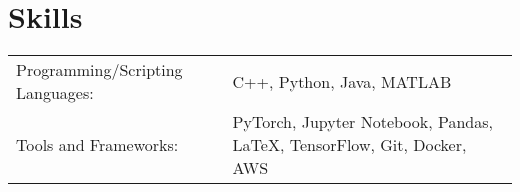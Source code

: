 \documentclass[a4paper,12pt]{article}
\begin{document}
\section{Skills}
\begin{tabularx}{\linewidth}{@{}l X@{}}
Programming/Scripting Languages: &  \normalsize{C++, Python, Java, MATLAB}\\
Tools and Frameworks: &  \normalsize{PyTorch, Jupyter Notebook, Pandas, \LaTeX, TensorFlow, Git, Docker, AWS }\\  
\end{tabularx}


\vfill
{}
\end{document}

